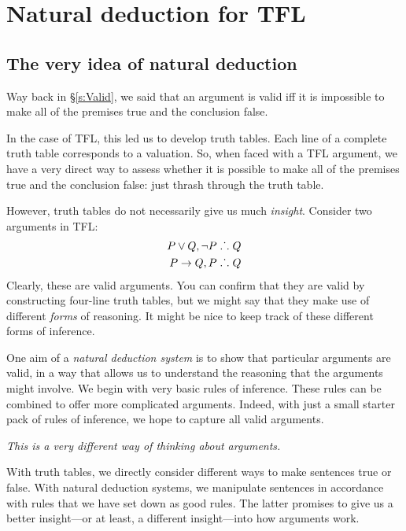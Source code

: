 \part{Natural deduction for TFL}
\label{ch.NDTFL}

\chapter{The very idea of natural deduction}\label{s:NDVeryIdea}

Way back in \S\ref{s:Valid}, we said that an argument is valid iff it is impossible to make all of the premises true and the conclusion false. 

In the case of TFL, this led us to develop truth tables. Each line of a complete truth table corresponds to a valuation. So, when faced with a TFL argument, we have a very direct way to assess whether it is possible to make all of the premises true and the conclusion false: just thrash through the truth table.

However, truth tables do not necessarily give us much \emph{insight}. Consider two arguments in TFL:
	\begin{align*}
		P \vee Q, \neg P & \mathrel{\ldotp\dot{}\,\ldotp} Q\\
		P \rightarrow Q, P & \mathrel{\ldotp\dot{}\,\ldotp} Q
	\end{align*}
Clearly, these are valid arguments. You can confirm that they are valid by constructing four-line truth tables, but we might say that they make use of different \emph{forms} of reasoning. It might be nice to keep track of these different forms of inference. 

One aim of a \emph{natural deduction system} is to show that particular arguments are valid, in a way that allows us to understand the reasoning that the arguments might involve. We begin with very basic rules of inference. These rules can be combined to offer more complicated arguments. Indeed, with just a small starter pack of rules of inference, we hope to capture all valid arguments. 

\emph{This is a very different way of thinking about arguments.} 

With truth tables, we directly consider different ways to make sentences true or false. With natural deduction systems, we manipulate sentences in accordance with rules that we have set down as good rules. The latter promises to give us a better insight---or at least, a different insight---into how arguments work.

